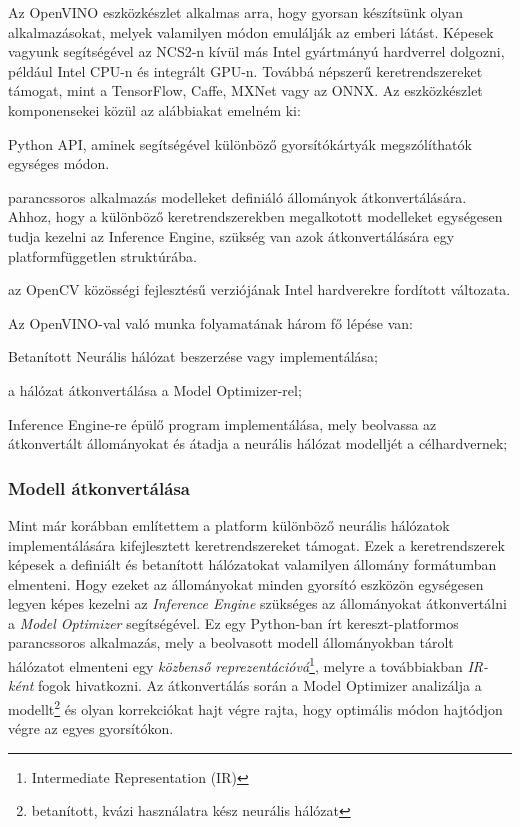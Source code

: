 Az OpenVINO eszközkészlet alkalmas arra, hogy gyorsan készítsünk olyan alkalmazásokat, melyek valamilyen módon emulálják az emberi látást. Képesek vagyunk segítségével az NCS2-n kívül más Intel gyártmányú hardverrel dolgozni, például Intel CPU-n és integrált GPU-n. Továbbá népszerű keretrendszereket támogat, mint a TensorFlow, Caffe, MXNet vagy az ONNX. Az eszközkészlet komponensekei közül az alábbiakat emelném ki:
\begin{description}[noitemsep]
	\item[Inference Engine] Python API, aminek segítségével különböző gyorsítókártyák megszólíthatók egységes módon.
	\item[Model Optimizer] parancssoros alkalmazás modelleket definiáló állományok átkonvertálására. Ahhoz, hogy a különböző keretrendszerekben megalkotott modelleket egységesen tudja kezelni az Inference Engine, szükség van azok átkonvertálására egy platformfüggetlen struktúrába.
	\item[OpenCV] az OpenCV közösségi fejlesztésű verziójának Intel hardverekre fordított változata.
\end{description}

Az OpenVINO-val való munka folyamatának három fő lépése van:
\begin{enumerate*}[label={}, font=\bfseries]
	\item Betanított Neurális hálózat beszerzése vagy implementálása;
	\item a hálózat átkonvertálása a Model Optimizer-rel;
	\item Inference Engine-re épülő program implementálása, mely beolvassa az átkonvertált állományokat és átadja a neurális hálózat modelljét a célhardvernek;
\end{enumerate*}

\subsubsection{Modell átkonvertálása}
Mint már korábban említettem a platform különböző neurális hálózatok implementálására kifejlesztett keretrendszereket támogat. Ezek a keretrendszerek képesek a definiált és betanított hálózatokat valamilyen állomány formátumban elmenteni. Hogy ezeket az állományokat minden gyorsító eszközön egységesen legyen képes kezelni az \emph{Inference Engine} szükséges az állományokat átkonvertálni a \emph{Model Optimizer} segítségével. Ez egy Python-ban írt kereszt-platformos parancssoros alkalmazás, mely a beolvasott modell állományokban tárolt hálózatot elmenteni egy \emph{közbenső reprezentációvá}\footnote{Intermediate Representation (IR)}, melyre a továbbiakban \emph{IR-ként} fogok hivatkozni. Az átkonvertálás során a Model Optimizer analizálja a modellt\footnote{betanított, kvázi használatra kész neurális hálózat} és olyan korrekciókat hajt végre rajta, hogy optimális módon hajtódjon végre az egyes gyorsítókon. 

